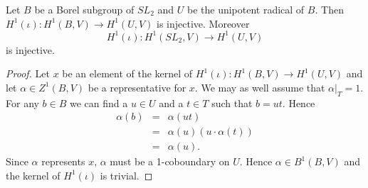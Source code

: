 \begin{lemma} Let $B$ be a Borel subgroup of $SL_2$ and $U$ be the unipotent radical of $B$. Then $H^1(\iota):H^1(B, V)\rightarrow H^1(U, V)$ is injective. Moreover
\begin{displaymath}
	H^1(\iota): H^1(SL_2, V)\rightarrow H^1(U, V)
\end{displaymath}
is injective.
\end{lemma}
\begin{proof}
Let $x$ be an element of the kernel of $H^1(\iota):H^1(B,V)\rightarrow H^1(U,V)$ and let $\alpha \in Z^1(B,V)$ be a representative for $x$. We may as well assume that $\alpha|_T = 1$. For any $b \in B$ we can find a $u \in U$ and a $t \in T$ such that $b = ut$. Hence
\begin{eqnarray*}
	\alpha(b) &=& \alpha(ut) \\
	&=& \alpha(u) (u \cdot \alpha(t)) \\
	&=& \alpha(u).
\end{eqnarray*}
Since $\alpha$ represents $x$, $\alpha$ must be a 1-coboundary on $U$. Hence $\alpha \in B^1(B, V)$ and the kernel of $H^1(\iota)$ is trivial.
\end{proof}
